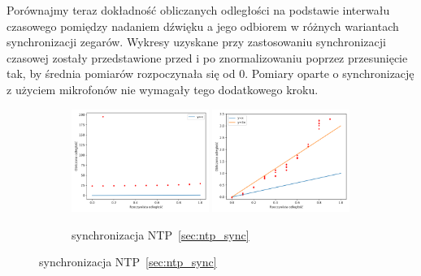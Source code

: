 Porównajmy teraz dokładność obliczanych odległości na podstawie interwału czasowego pomiędzy nadaniem dźwięku a jego odbiorem w różnych wariantach synchronizacji zegarów. Wykresy uzyskane przy zastosowaniu synchronizacji czasowej zostały przedstawione przed i po znormalizowaniu poprzez przesunięcie tak, by średnia pomiarów rozpoczynała się od 0. Pomiary oparte o synchronizację z użyciem mikrofonów nie wymagały tego dodatkowego kroku.

\begin{figure}[H]
    \centering
    \begin{subfigure}{\textwidth}
        \centering
        \includegraphics[width=0.49\textwidth]{pics/ntp_sync_dist/dists.png}
        \includegraphics[width=0.49\textwidth]{pics/ntp_sync_dist/dists_close.png}
        \caption{synchronizacja NTP~\ref{sec:ntp_sync}}
        \label{pic:ntp_sync_dist}
    \end{subfigure}
\end{figure}
